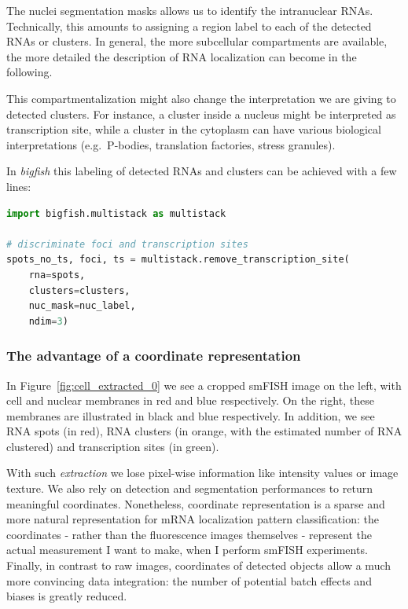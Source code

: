 The nuclei segmentation masks allows us to identify the intranuclear \ac{RNA}s.
Technically, this amounts to assigning a region label to each of the detected \ac{RNA}s or clusters.
In general, the more subcellular compartments are available, the more detailed the description of \ac{RNA} localization can become in the following.

This compartmentalization might also change the interpretation we are giving to detected clusters.
For instance, a cluster inside a nucleus might be interpreted as transcription site, while a cluster in the cytoplasm can have various biological interpretations (e.g.~P-bodies, translation factories, stress granules).

In \emph{bigfish} this labeling of detected \ac{RNA}s and clusters can be achieved with a few lines:\\

\begin{minipage}{0.9\textwidth}
\begin{lstlisting}[language=Python]
import bigfish.multistack as multistack

# discriminate foci and transcription sites
spots_no_ts, foci, ts = multistack.remove_transcription_site(
    rna=spots,
    clusters=clusters,
    nuc_mask=nuc_label,
    ndim=3)
\end{lstlisting}
\end{minipage}

\subsubsection{The advantage of a coordinate representation}

In Figure~\ref{fig:cell_extracted_0} we see a cropped \ac{smFISH} image on the left, with cell and nuclear membranes in red and blue respectively.
On the right, these membranes are illustrated in black and blue respectively.
In addition, we see \ac{RNA} spots (in red), \ac{RNA} clusters (in orange, with the estimated number of \ac{RNA} clustered) and transcription sites (in green).

With such \emph{extraction} we lose pixel-wise information like intensity values or image texture.
We also rely on detection and segmentation performances to return meaningful coordinates.
Nonetheless, coordinate representation is a sparse and more natural representation for \ac{mRNA} localization pattern classification: the coordinates - rather than the fluorescence images themselves - represent the actual measurement I want to make, when I perform smFISH experiments.
Finally, in contrast to raw images, coordinates of detected objects allow a much more convincing data integration: the number of potential batch effects and biases is greatly reduced.\\

